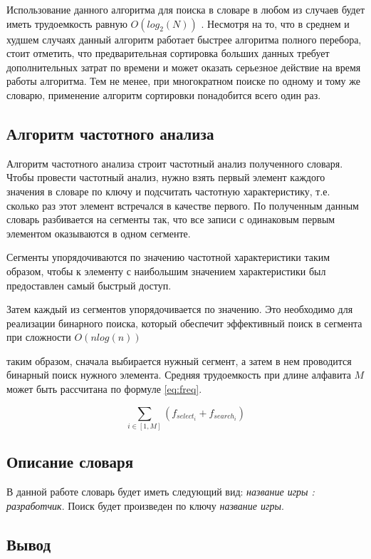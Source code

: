 Использование данного алгоритма для поиска в словаре в любом из случаев будет иметь трудоемкость равную $O(log_2(N))$ . Несмотря на то, что в среднем и худшем случаях данный алгоритм работает быстрее алгоритма полного перебора, стоит отметить, что предварительная сортировка больших данных требует дополнительных затрат по времени и может оказать серьезное действие на время работы алгоритма. Тем не менее, при многократном поиске по одному и тому же словарю, применение алгоритм сортировки понадобится всего один раз.

\subsection{Алгоритм частотного анализа}

Алгоритм частотного анализа строит частотный анализ полученного словаря. Чтобы провести частотный анализ, нужно взять первый элемент каждого значения в словаре по ключу и подсчитать частотную характеристику, т.е. сколько раз этот элемент встречался в качестве первого. По полученным данным словарь разбивается на сегменты так, что все записи с одинаковым первым элементом оказываются в одном сегменте.

Сегменты упорядочиваются по значению частотной характеристики таким образом, чтобы к элементу с наибольшим значением характеристики был предоставлен самый быстрый доступ.

Затем каждый из сегментов упорядочивается по значению. Это необходимо для реализации бинарного поиска, который обеспечит эффективный поиск в сегмента при сложности $O(nlog(n))$

таким образом, сначала выбирается нужный сегмент, а затем в нем проводится бинарный поиск  нужного элемента. Средняя трудоемкость при длине алфавита $M$ может быть рассчитана по формуле \eqref{eq:freq}.

\begin{equation}
   \sum_{i \in [1, M]} (f_{select_i} + f_{search_i})
   \label{eq:freq}
\end{equation}

\subsection{Описание словаря}

В данной работе словарь будет иметь следующий вид: \textit{название игры : разработчик}. Поиск будет произведен по ключу \textit{название игры}.

\subsection{Вывод}

